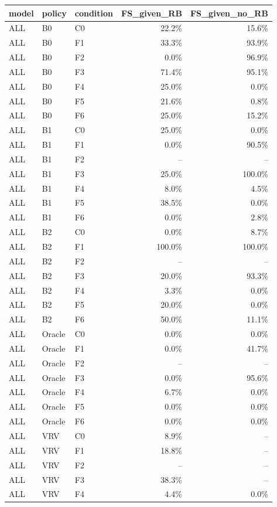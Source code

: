 \begin{tabular}{lllrr}
\toprule
model & policy & condition & FS\_given\_RB & FS\_given\_no\_RB \\
\midrule
ALL & B0 & C0 & 22.2\% & 15.6\% \\
ALL & B0 & F1 & 33.3\% & 93.9\% \\
ALL & B0 & F2 & 0.0\% & 96.9\% \\
ALL & B0 & F3 & 71.4\% & 95.1\% \\
ALL & B0 & F4 & 25.0\% & 0.0\% \\
ALL & B0 & F5 & 21.6\% & 0.8\% \\
ALL & B0 & F6 & 25.0\% & 15.2\% \\
ALL & B1 & C0 & 25.0\% & 0.0\% \\
ALL & B1 & F1 & 0.0\% & 90.5\% \\
ALL & B1 & F2 & -- & -- \\
ALL & B1 & F3 & 25.0\% & 100.0\% \\
ALL & B1 & F4 & 8.0\% & 4.5\% \\
ALL & B1 & F5 & 38.5\% & 0.0\% \\
ALL & B1 & F6 & 0.0\% & 2.8\% \\
ALL & B2 & C0 & 0.0\% & 8.7\% \\
ALL & B2 & F1 & 100.0\% & 100.0\% \\
ALL & B2 & F2 & -- & -- \\
ALL & B2 & F3 & 20.0\% & 93.3\% \\
ALL & B2 & F4 & 3.3\% & 0.0\% \\
ALL & B2 & F5 & 20.0\% & 0.0\% \\
ALL & B2 & F6 & 50.0\% & 11.1\% \\
ALL & Oracle & C0 & 0.0\% & 0.0\% \\
ALL & Oracle & F1 & 0.0\% & 41.7\% \\
ALL & Oracle & F2 & -- & -- \\
ALL & Oracle & F3 & 0.0\% & 95.6\% \\
ALL & Oracle & F4 & 6.7\% & 0.0\% \\
ALL & Oracle & F5 & 0.0\% & 0.0\% \\
ALL & Oracle & F6 & 0.0\% & 0.0\% \\
ALL & VRV & C0 & 8.9\% & -- \\
ALL & VRV & F1 & 18.8\% & -- \\
ALL & VRV & F2 & -- & -- \\
ALL & VRV & F3 & 38.3\% & -- \\
ALL & VRV & F4 & 4.4\% & 0.0\% \\

\end{tabular}
